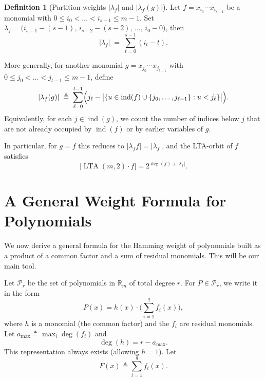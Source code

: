 \documentclass[conference]{IEEEtran}
\theoremstyle{definition}
\newtheorem{definition}{Definition}
\DeclareMathOperator{\LTA}{LTA}
\newcommand{\ind}{\operatorname{ind}}
\begin{document}
\begin{definition}[Partition weights $|\lambda_f|$ and $|\lambda_f (g)|$]
Let $f\!=\!x_{i_0}\cdots x_{i_{s-1}}$ be a monomial with
$0\!\le\! i_0\!<\!\dots\!<\!i_{s-1}\!\le\! m-1$.
Set $\lambda_f \!=\! \bigl(i_{s-1}-(s-1),\,i_{s-2}-(s-2),\,\dots,\,i_0-0\bigr)$, then
\[
|\lambda_f| \;=\; \sum_{t=0}^{s-1} (i_t-t).
\]

More generally, for another monomial
$g=x_{j_0}\cdots x_{j_{t-1}}$ with $0\le j_0<\dots<j_{t-1}\le m-1$,
define
\[
|\lambda_f (g)|
\;\triangleq\;
\sum_{\ell=0}^{t-1}
\Bigl(j_\ell - 
\bigl|\{u\in\ind(f)\cup\{j_0,\dots,j_{\ell-1}\} : u<j_\ell\}\bigr|\Bigr).
\]
Equivalently, for each $j\in\ind(g)$, we count the number of indices
below $j$ that are not already occupied by $\ind(f)$ or by earlier
variables of $g$.

In particular, for $g=f$ this reduces to $|\lambda_f f|=|\lambda_f|$,
and the LTA-orbit of $f$ satisfies
\begin{equation}\label{eq:orbit-single-again}
    \bigl|\LTA(m,2)\cdot f\bigr| = 2^{\deg(f)+|\lambda_f|}.
\end{equation}

\end{definition}


\section{A General Weight Formula for Polynomials}
\label{sec:general-weight}

We now derive a general formula for the Hamming weight of polynomials built as a product of a common factor and a sum of residual monomials. This will be our main tool.


Let $\mathcal{P}_r$ be the set of polynomials in $\mathbb{R}_m$ of total degree $r$. For $P\in\mathcal{P}_r$, we write it in the form
\begin{equation}
P(x) = h(x)\cdot\Big(\sum_{i=1}^q f_i(x)\Big),
\label{eq:P-factorised}
\end{equation}
where $h$ is a monomial (the common factor) and the $f_i$ are residual monomials. Let $a_{\max}\triangleq\max_i \deg(f_i)$ and
\begin{equation}\label{eq:deg-h}
\deg(h)=r-a_{\max}.
\end{equation}
This representation always exists (allowing $h=1$). Let
\[
F(x) \triangleq \sum_{i=1}^q f_i(x).
\]
\end{document}
